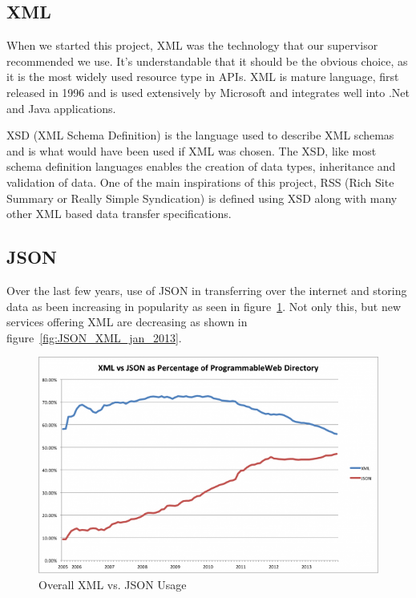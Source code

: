 \documentclass{article}
\begin{document}
\subsection{XML}
When we started this project, XML was the technology that our supervisor recommended we use. It's understandable that it should be the obvious choice, as it is the most widely used resource type in APIs\cite{maleshkova2010investigating}. XML is mature language, first released in 1996 and is used extensively by Microsoft and integrates well into .Net and Java applications.

XSD (XML Schema Definition) is the language used to describe XML schemas and is what would have been used if XML was chosen. The XSD, like most schema definition languages enables the creation of data types, inheritance and validation of data. One of the main inspirations of this project, RSS (Rich Site Summary or Really Simple Syndication) is defined using XSD along with many other XML based data transfer specifications.

\subsection{JSON}
Over the last few years, use of JSON in transferring over the internet and storing data as been increasing in popularity as seen in figure~\ref{fig:JSON_XML_all_time}. Not only this, but new services offering XML are decreasing as shown in figure~\ref{fig:JSON_XML_jan_2013}.

\begin{figure}[h]
	\centering
	\includegraphics[scale=0.37]{images/xml_json_all_time.png}
	\caption{Overall XML vs. JSON Usage\protect\cite{duvander2013json}}
	\label{fig:JSON_XML_all_time}
\end{figure}
\end{document}

